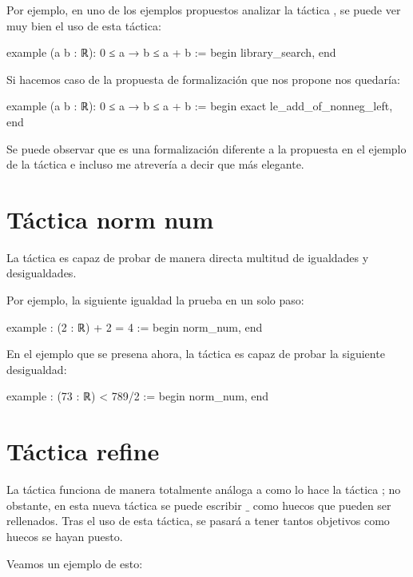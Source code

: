 Por ejemplo, en uno de los ejemplos propuestos analizar la táctica
, se puede ver muy bien el uso de esta
táctica:

\begin{leancode}
example (a b : ℝ): 0 ≤ a → b ≤ a + b :=
begin
  library_search,
end
\end{leancode}

Si hacemos caso de la propuesta de formalización que nos propone nos quedaría:

\begin{leancode}
example (a b : ℝ): 0 ≤ a → b ≤ a + b :=
begin
  exact le_add_of_nonneg_left,
end
\end{leancode}

Se puede observar que es una formalización diferente a la propuesta en
el ejemplo de la táctica  e incluso me
atrevería a decir que más elegante.

\section{Táctica norm num}

La táctica  es capaz de probar de manera
directa multitud de igualdades y desigualdades.

Por ejemplo, la siguiente igualdad la prueba en un solo paso:

\begin{leancode}
example : (2 : ℝ) + 2 = 4 :=
begin
  norm_num,
end
\end{leancode}

En el ejemplo que se presena ahora, la táctica  es
capaz de probar la siguiente desigualdad:
\begin{leancode}
example : (73 : ℝ) < 789/2 :=
begin
  norm_num,
end
\end{leancode}

\section{Táctica refine}

La táctica  funciona de manera totalmente
análoga a como lo hace la táctica ; no obstante,
en esta nueva táctica se puede escribir \(\_\) como huecos que pueden
ser rellenados. Tras el uso de esta táctica, se pasará a tener tantos
objetivos como huecos se hayan puesto.

Veamos un ejemplo de esto:


